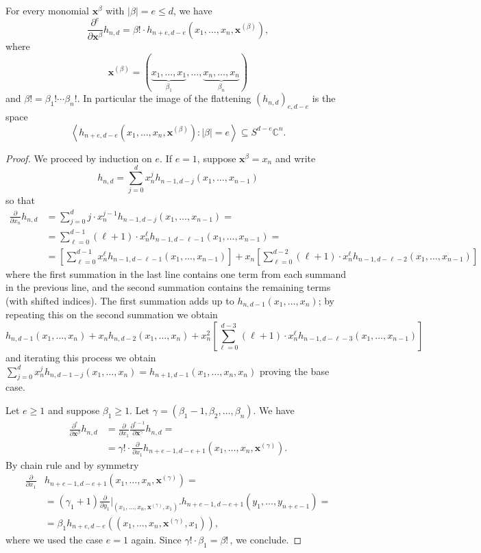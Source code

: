 \documentclass{toc}
\newcommand{\vvirg}{ , \dots , }
\newcommand{\bfx}{\mathbf{x}}
\newcommand{\bbC}{\mathbb{C}}
\begin{document}
\begin{proposition}\label{prop: derivatives of h}
 For every monomial $\bfx^\beta$ with $\vert \beta \vert = e \leq d$, we have 
 \[
  \frac{\partial^e}{\partial \bfx^\beta} h_{n,d} = \beta! \cdot h_{n+e , d-e} (x_1 \vvirg x_n, \bfx^{(\beta)}),
 \]
 where
 \[
   \bfx^{(\beta)} = (\underbrace{x_1 \vvirg x_1}_{\beta_1} \vvirg \underbrace{x_n \vvirg x_n}_{\beta_n})
 \]
 and $\beta! = \beta_1! \cdots \beta_n!$. In particular the image of
 the flattening $(h_{n,d})_{e,d-e}$ is the space
\[
\left\langle  h_{n+e,d-e}(x_1 \vvirg x_n,\bfx^{(\beta)}) : \vert \beta \vert = e \right\rangle \subseteq S^{d-e} \bbC^n.
\]
\end{proposition}
\begin{proof}
  We proceed by induction on $e$. If $e = 1$, suppose $\bfx^\beta = x_n$ and write
  \[
    h_{n,d} = \sum_{j=0}^d x_n^j h_{n-1, d-j}(x_1 \vvirg x_{n-1})
  \]
  so that
 \begin{align*}
  \frac{\partial}{\partial x_n} h_{n,d} &= \sum_{j=0}^d j \cdot x_n^{j-1} h_{n-1, d-j}(x_1 \vvirg x_{n-1}) = \\
  &= \sum_{\ell=0}^{d-1} (\ell+1) \cdot x_n^\ell h_{n-1, d-\ell -1}(x_1 \vvirg x_{n-1}) = \\
  & = \left[\sum_{\ell=0}^{d-1} x_n^\ell h_{n-1, d-\ell -1}(x_1 \vvirg x_{n-1})\right] + x_n\left[\sum_{\ell=0}^{d-2} (\ell+1) \cdot x_n^\ell h_{n-1, d-\ell -2}(x_1 \vvirg x_{n-1})\right]
 \end{align*}
where the first summation in the last line contains one term from each summand in the previous line, and the second summation contains the remaining terms (with shifted indices). The first summation adds up to $h_{n,d-1} (x_1 \vvirg x_n)$; by repeating this on the second summation we obtain
\[
h_{n,d-1} (x_1 \vvirg x_n) + x_n h_{n,d-2} (x_1 \vvirg x_n) + x_n^2 \left[\sum_{\ell=0}^{d-3} (\ell+1) \cdot x_n^\ell h_{n-1, d-\ell -3}(x_1 \vvirg x_{n-1})\right]
\]
and iterating this process we obtain $\sum_{j = 0}^d x_n^j h_{n,d-1 -j} (x_1 \vvirg x_n) = h_{n+1,d-1}(x_1 \vvirg x_n,x_n)$ proving the base case.

Let $e \geq 1$ and suppose $\beta_1 \geq 1$. Let $\gamma = (\beta_1-1,\beta_2 \vvirg \beta_n)$. We have
 \begin{align*}
  \frac{\partial^e}{\partial \bfx^\beta} h_{n,d} &= \frac{\partial }{\partial x_1} \frac{\partial ^{e-1}}{\partial \bfx^\gamma} h_{n,d} = \\
  &= \gamma! \cdot \frac{\partial}{\partial x_1} h_{n+e-1,d-e+1}(x_1 \vvirg x_n, \bfx^{(\gamma)}).
  \end{align*}
 By chain rule and by symmetry
  \begin{align*}
\frac{\partial}{\partial x_1} &h_{n+e-1,d-e+1}(x_1 \vvirg x_n, \bfx^{(\gamma)}) = \\
&=(\gamma_1+1) \frac{\partial}{\partial y_1}\bigl\vert_{(x_1 \vvirg x_n, \bfx^{(\gamma)},x_1)} \bigr. h_{n+e-1,d-e+1}(y_1 \vvirg y_{n+e-1})= \\ 
&=\beta_1 h_{n+e,d-e}((x_1 \vvirg x_n, \bfx^{(\gamma)},x_1)),
  \end{align*}
  where we used the case $e = 1$ again. Since $\gamma! \cdot \beta_1 = \beta!$\,, we conclude.
\end{proof}
\end{document}
